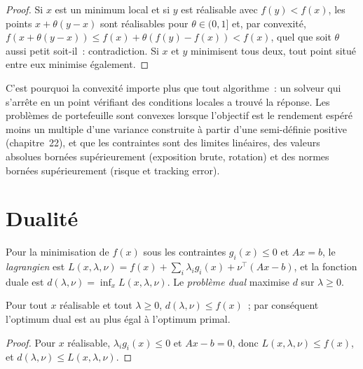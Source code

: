 \begin{proof}
Si $x$ est un minimum local et si $y$ est réalisable avec $f(y) < f(x)$, les points $x + \theta(y - x)$ sont réalisables pour $\theta \in (0, 1]$ et, par convexité, $f(x + \theta(y -
x)) \le f(x) + \theta(f(y) - f(x)) < f(x)$, quel que soit $\theta$ aussi petit soit-il~: contradiction. Si $x$ et $y$ minimisent tous deux, tout point situé entre eux minimise également.
\end{proof}

C'est pourquoi la convexité importe plus que tout algorithme~: un solveur qui s'arrête en un point vérifiant des conditions locales a trouvé la réponse. Les problèmes de portefeuille
sont convexes lorsque l'objectif est le rendement espéré moins un multiple d'une variance construite à partir d'une  semi-définie positive (chapitre~22), et que les contraintes sont
des limites linéaires, des valeurs absolues bornées supérieurement (exposition brute, rotation) et des normes bornées supérieurement (risque et tracking error).

\section{Dualité}

\begin{definition}\label{def:qm:convex-optimisation:dual}
Pour la minimisation de $f(x)$ sous les contraintes $g_i(x) \le 0$ et $Ax = b$, le \emph{lagrangien} est $L(x, \lambda, \nu) = f(x) + \sum_i\lambda_ig_i(x) + \nu^\top(Ax
- b)$, et la fonction duale est $d(\lambda, \nu) = \inf_xL(x, \lambda, \nu)$. Le \emph{problème dual} maximise $d$ sur $\lambda \ge 0$.
\end{definition}

\begin{proposition}\label{prop:qm:convex-optimisation:weak}
Pour tout $x$ réalisable et tout $\lambda \ge 0$, $d(\lambda, \nu) \le f(x)$~; par conséquent l'optimum dual est au plus égal à l'optimum primal.
\end{proposition}

\begin{proof}
Pour $x$ réalisable, $\lambda_ig_i(x) \le 0$ et $Ax - b = 0$, donc $L(x, \lambda, \nu) \le f(x)$, et $d(\lambda, \nu) \le L(x, \lambda, \nu)$.
\end{proof}

